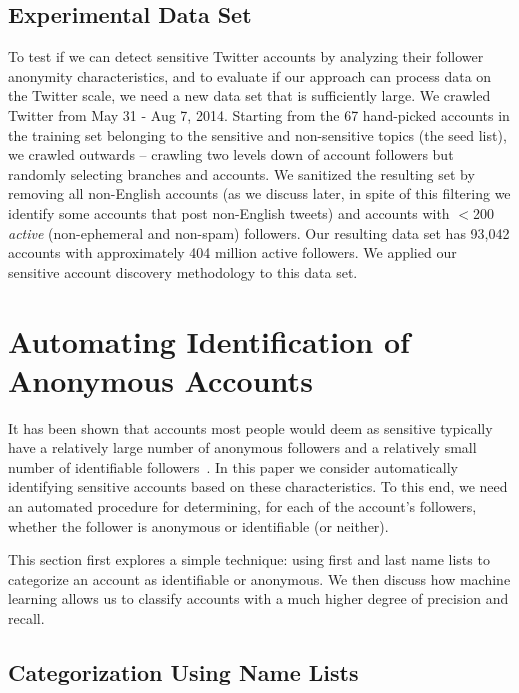 \documentclass[conference]{IEEEtran}
\begin{document}
\subsection{Experimental Data Set}
\label{sec:twittersensitivetestdata}
To test if we can detect sensitive Twitter accounts by analyzing their follower anonymity characteristics, and to evaluate if our approach can process data on the Twitter scale, we need a new data set that is sufficiently large. We crawled Twitter from May 31 - Aug 7, 2014. Starting from the 67 hand-picked accounts in the training set belonging to the sensitive and non-sensitive topics (the seed list), we crawled outwards -- crawling two levels down of account followers but randomly selecting branches and accounts.
We sanitized the resulting set by removing all non-English accounts (as we discuss later, in spite of this filtering we identify some accounts that post non-English tweets) and accounts with $<$200 \textit{active} (non-ephemeral and non-spam) followers. Our resulting data set has 93,042 accounts with approximately 404 million active followers. We applied our sensitive account discovery methodology to this data set.

\section{Automating Identification of Anonymous Accounts}
\label{sec:automatedsensitivedetection}

It has been shown that accounts most people would deem as sensitive typically have a relatively large number of anonymous followers and a relatively small number of identifiable followers~\cite{PeddintiCOSN2014}. In this paper we consider automatically identifying sensitive accounts based on these characteristics.
To this end, we need an automated procedure for determining, for each of the account's followers,  whether  the follower is anonymous or identifiable (or neither).  

This section first explores a simple technique: using first and last name lists to categorize an account as identifiable or anonymous.  We then discuss how machine learning allows us to classify accounts with a much higher degree of precision and recall.

\subsection{Categorization Using Name Lists}
\label{sec:namelistmembership}
\end{document}
